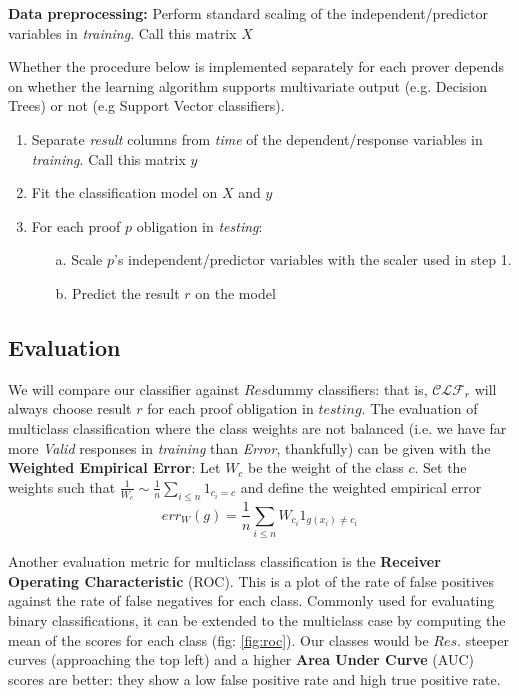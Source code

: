 \documentclass[]{article}
\begin{document}
\textbf{Data preprocessing:} Perform standard scaling of the independent/predictor variables in \emph{training}. Call this matrix $X$
\label{preprocess}

Whether the procedure below is implemented separately for each prover depends on whether the learning algorithm supports multivariate output (e.g. Decision Trees) or not (e.g Support Vector classifiers). 

\begin{enumerate}
\item{Separate \textit{result} columns from \textit{time} of the dependent/response variables in \textit{training}. Call this matrix $y$}
\item{Fit the classification model on $X$ and $y$}
\item{For each proof $p$ obligation in \textit{testing}:}
\begin{itemize}
	\item[a.] Scale $p$'s independent/predictor variables with the scaler used in step 1.
	\item[b.] Predict the result $r$ on the model
\end{itemize}
\end{enumerate}

\subsection{Evaluation}
\label{eval1}
We will compare our classifier against \textbar$Res$\textbar dummy classifiers: that is, $\mathcal{CLF}_{r}$ will always choose result $r$ for each proof obligation in $testing$.  
The evaluation of multiclass classification where the class weights are not balanced (i.e. we have far more \textit{Valid} responses in \textit{training} than \textit{Error}, thankfully) can be given with the \textbf{Weighted Empirical Error}: Let $W_c$ be the weight of the class $c$. Set the weights such that $\frac{1}{W_c} \sim \frac{1}{n} \sum_{i \leq n} 1_{c_i = c}$ and define the weighted empirical error
\[
	err_W(g) = \frac{1}{n} \sum_{i \leq n} W_{c_i} 1_{g(x_i) \neq c_i}
\]

Another evaluation metric for multiclass classification is the  \textbf{Receiver Operating Characteristic} (ROC). This is a plot of the rate of false positives against the rate of false negatives for each class. Commonly used for evaluating binary classifications, it can be extended to the multiclass case by computing the mean of the scores for each class (fig: \ref{fig:roc}). Our classes would be $Res$. steeper curves (approaching the top left) and a higher \textbf{Area Under Curve} (AUC) scores  are better: they show a low false positive rate and high true positive rate.   
\end{document}
